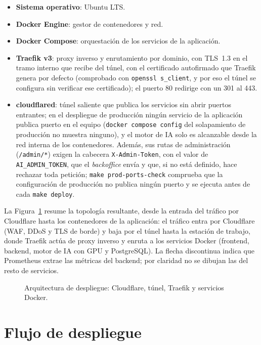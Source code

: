 \begin{itemize}
    \item \textbf{Sistema operativo}: Ubuntu LTS.
    \item \textbf{Docker Engine}: gestor de contenedores y red.
    \item \textbf{Docker Compose}: orquestación de los servicios de la aplicación.
    \item \textbf{Traefik v3}: proxy inverso y enrutamiento por dominio, con TLS~1.3 en el tramo interno que recibe del túnel, con el certificado autofirmado que Traefik genera por defecto (comprobado con \texttt{openssl s\_client}, y por eso el túnel se configura sin verificar ese certificado); el puerto 80 redirige con un 301 al 443.
    \item \textbf{cloudflared}: túnel saliente que publica los servicios sin abrir puertos entrantes; en el despliegue de producción ningún servicio de la aplicación publica puerto en el equipo (\texttt{docker compose config} del solapamiento de producción no muestra ninguno), y el motor de IA solo es alcanzable desde la red interna de los contenedores. Además, sus rutas de administración (\texttt{/admin/*}) exigen la cabecera \texttt{X-Admin-Token}, con el valor de \texttt{AI\_ADMIN\_TOKEN}, que el \emph{backoffice} envía y que, si no está definido, hace rechazar toda petición; \texttt{make prod-ports-check} comprueba que la configuración de producción no publica ningún puerto y se ejecuta antes de cada \texttt{make deploy}.
\end{itemize}

La Figura~\ref{fig:infra-prod} resume la topología resultante, desde la entrada del tráfico por Cloudflare hasta los contenedores de la aplicación: el tráfico entra por Cloudflare (WAF, DDoS y TLS de borde) y baja por el túnel hasta la estación de trabajo, donde Traefik actúa de proxy inverso y enruta a los servicios Docker (frontend, backend, motor de IA con GPU y PostgreSQL). La flecha discontinua indica que Prometheus extrae las métricas del backend; por claridad no se dibujan las del resto de servicios.

\begin{figure}[ht]
\centering
\resizebox{0.85\textwidth}{!}{}
\caption{Arquitectura de despliegue: Cloudflare, túnel, Traefik y servicios Docker.}
\label{fig:infra-prod}
\end{figure}

\section{Flujo de despliegue}

